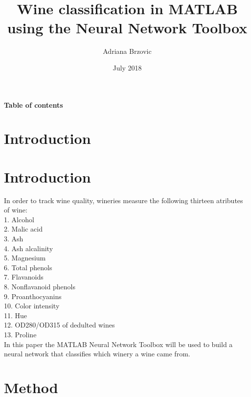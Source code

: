 \documentclass{article}
\title{Wine classification in MATLAB using the Neural Network Toolbox}
\author{Adriana Brzovic}
\date{July 2018}
\begin{document}
	\maketitle
	\newpage
	\huge
	\textbf{Table of contents}
	\normalsize
	\section{Introduction}
	\newpage
	\section*{Introduction}
	In order to track wine quality, wineries measure the following thirteen atributes of wine:\\1. Alcohol \\2. Malic acid \\3. Ash\\4. Ash alcalinity\\5. Magnesium\\6. Total phenols\\7. Flavanoids\\8. Nonflavanoid phenols\\9. Proanthocyanins\\10. Color intensity\\11. Hue\\ 12. OD280/OD315 of dedulted wines\\ 13. Proline \\In this paper the MATLAB Neural Network Toolbox will be used to build a neural network that classifies which winery a wine came from.
	\section*{Method}
\end{document}

